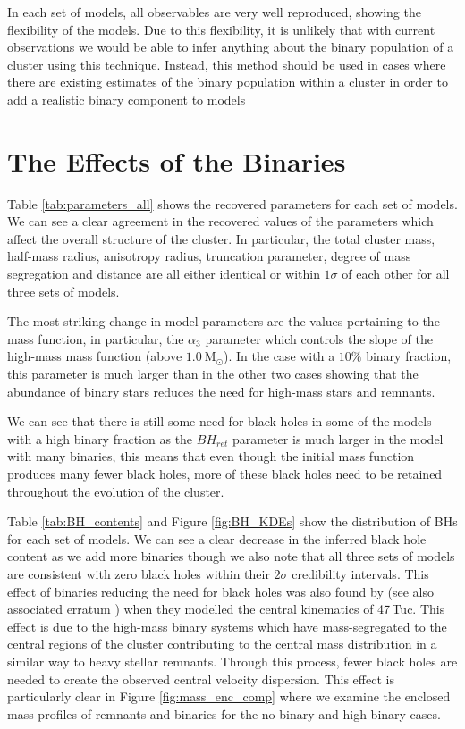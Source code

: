 In each set of models, all observables are very well reproduced, showing the flexibility of the
 models. Due to this flexibility, it is unlikely that with current observations we
would be able to infer anything about the binary population of a cluster using this technique.
Instead, this method should be used in cases where there are existing estimates of the binary
population within a cluster in order to add a realistic binary component to  models



\section{The Effects of the Binaries}


Table \ref{tab:parameters_all} shows the recovered parameters for each set of models. We can see a
clear agreement in the recovered values of the parameters which affect the overall structure of the
cluster. In particular, the total cluster mass, half-mass radius, anisotropy radius, truncation
parameter, degree of mass segregation and distance are all either identical or within $1\sigma$ of
each other for all three sets of models.



The most striking change in model parameters are the values pertaining to the mass function, in
particular, the $\alpha_3$ parameter which controls the slope of the high-mass mass function (above
$1.0 \ \mathrm{M}_\odot$). In the case with a $10\%$ binary fraction, this parameter is much larger
than in the other two cases showing that the abundance of binary stars reduces the need for high-mass
stars and remnants.

We can see that there is still some need for black holes in some of the models with a high binary fraction
as the $BH_{ret}$ parameter is much larger in the model with many binaries, this means that even
though the initial mass function produces many fewer black holes, more of these black holes need to
be retained throughout the evolution of the cluster.

Table \ref{tab:BH_contents} and Figure \ref{fig:BH_KDEs} show the distribution of BHs for each set
of models. We can see a clear decrease in the inferred black hole content as we add more binaries
though we also note that all three sets of models are consistent with zero black holes within their
$2\sigma$ credibility intervals. This effect of binaries reducing the need for black holes was also found by
\citet{Mann2019} (see also associated erratum \citealt{Mann2020}) when they modelled the central
kinematics of 47\,Tuc. This effect is due to the high-mass binary systems which have mass-segregated
to the central regions of the cluster contributing to the central mass distribution in a similar way
to heavy stellar remnants. Through this process, fewer black holes are needed to create the observed
central velocity dispersion. This effect is particularly clear in Figure \ref{fig:mass_enc_comp}
where we examine the enclosed mass profiles of remnants and binaries for the no-binary and
high-binary cases.



